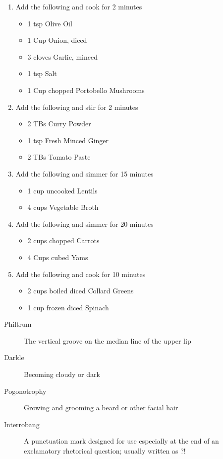\documentclass[a4paper,12pt]{book}
\begin{document}
\begin{enumerate}[label=\Roman*, font=\bfseries]
	\item Add the following and cook for 2 minutes
	\begin{itemize}
		\item 1 tsp Olive Oil
		\item 1 Cup Onion, diced
		\item 3 cloves Garlic, minced
		\item 1 tsp Salt
		\item 1 Cup chopped Portobello Mushrooms
	\end{itemize}
	\item Add the following and stir for 2 minutes
	\begin{itemize}
		\item 2 TBs Curry Powder
		\item 1 tsp Fresh Minced Ginger
		\item 2 TBs Tomato Paste
	\end{itemize}
	\item Add the following and simmer for 15 minutes
	\begin{itemize}
		\item 1 cup uncooked Lentils
		\item 4 cups Vegetable Broth
	\end{itemize}
	\item Add the following and simmer for 20 minutes
	\begin{itemize}
		\item 2 cups chopped Carrots
		\item 4 Cups cubed Yams
	\end{itemize}
	\item Add the following and cook for 10 minutes
	\begin{itemize}
		\item 2 cups boiled diced Collard Greens
		\item 1 cup frozen diced Spinach
	\end{itemize}
\end{enumerate}

\bigskip


\begin{description}
	\item[Philtrum] The vertical groove on the median line of the upper lip
	\item[Darkle] Becoming cloudy or dark
	\item[Pogonotrophy] Growing and grooming a beard or other facial hair
	\item[Interrobang] A punctuation mark designed for use especially at the end of an exclamatory rhetorical question; usually written as ?!
\end{description}
\end{document}
